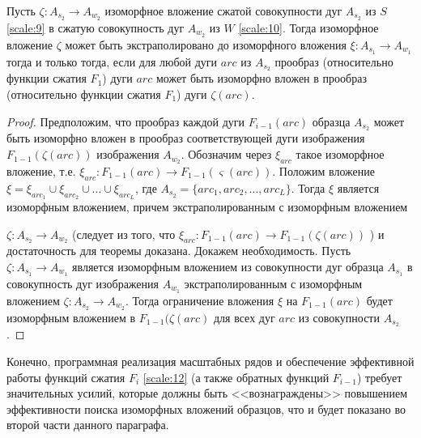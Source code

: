 \begin{theorem}
Пусть  $\zeta: A_{s_2} \to A_{w_2}$  изоморфное вложение сжатой совокупности дуг $A_{s_2}$ из $S$ \ref{scale:9} в  сжатую  совокупность дуг $A_{w_2}$ из  $W$ \ref{scale:10}. Тогда  изоморфное вложение  $\zeta$  может быть экстраполировано  до  изоморфного вложения  $\xi: A_{s_1} \to A_{w_1}$ тогда и только тогда, если   для любой дуги $arc$ из $A_{s_2}$ прообраз  (относительно  функции сжатия  $F_1$)  дуги  $arc$ может быть изоморфно вложен в прообраз  (относительно  функции сжатия  $F_1$)   дуги $\zeta(arc)$.                 
\label{scale:theoremA}
\end{theorem}            
\begin{proof}
Предположим, что  прообраз каждой дуги $F_{i-1}(arc)$ образца $A_{s_2}$  может быть изоморфно вложен в прообраз соответствующей дуги изображения  $F_{1-1}(\zeta (arc))$  изображения  $A_{w_2}$.  Обозначим через  $\xi_{arc}$ такое изоморфное вложение, т.е.  $\xi_{arc} : F_{1 -1}(arc) \to F_{1 -1}(\varsigma (arc))$.  
Положим вложение $\xi = \xi_{arc_1} \cup \xi_{arc_2} \cup ... \cup \xi_{arc_L}$, где $A_{s_2} = \{arc_1, arc_2, ..., arc_L\}$. Тогда $\xi$ является изоморфным вложением, причем  экстраполированным  с изоморфным вложением  

$\zeta : A_{s_2} \to A_{w_2}$ (следует из того, что $\xi_{arc} : F_{1 -1}(arc) \to F_{1 -1}(\zeta (arc))$ ) и достаточность для теоремы  доказана.    
Докажем необходимость. Пусть $\zeta : A_{s_1} \to A_{w_1}$ является изоморфным вложением из совокупности дуг образца  $A_{s_1}$  в совокупность дуг  изображения  $A_{w_1}$ экстраполированным  с изоморфным вложением  $\zeta : A_{s_2} \to A_{w_2}$.  Тогда ограничение вложения  $\xi$  на  $F_{1 -1}(arc)$  будет изоморфным вложением в $F_{1 -1}(\zeta (arc)$  для всех дуг  $arc$  из  совокупности  $A_{s_2}$. 
\end{proof}          

\begin{remark}
Конечно, программная реализация масштабных рядов и обеспечение эффективной работы функций сжатия $F_i$ \ref{scale:12}  (а также обратных функций $F_{i -1}$)  требует  значительных усилий, которые должны быть <<вознаграждены>> повышением эффективности поиска изоморфных вложений образцов, что и будет показано во второй части данного параграфа.
\end{remark}

